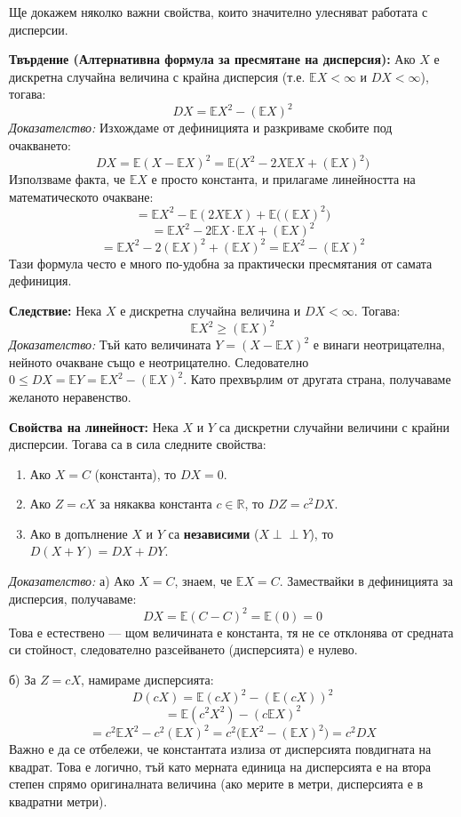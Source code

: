\documentclass{article}
\begin{document}
Ще докажем няколко важни свойства, които значително улесняват работата с дисперсии.

\textbf{Твърдение (Алтернативна формула за пресмятане на дисперсия):}
Ако $X$ е дискретна случайна величина с крайна дисперсия (т.е. $\mathbb{E}X < \infty$ и $DX < \infty$), тогава:
\[ DX = \mathbb{E}X^2 - (\mathbb{E}X)^2 \]
\textit{Доказателство:} Изхождаме от дефиницията и разкриваме скобите под очакването:
\[ DX = \mathbb{E}(X - \mathbb{E}X)^2 = \mathbb{E}\big( X^2 - 2X\mathbb{E}X + (\mathbb{E}X)^2 \big) \]
Използваме факта, че $\mathbb{E}X$ е просто константа, и прилагаме линейността на математическото очакване:
\[ = \mathbb{E}X^2 - \mathbb{E}(2X\mathbb{E}X) + \mathbb{E}\big( (\mathbb{E}X)^2 \big) \]
\[ = \mathbb{E}X^2 - 2\mathbb{E}X \cdot \mathbb{E}X + (\mathbb{E}X)^2 \]
\[ = \mathbb{E}X^2 - 2(\mathbb{E}X)^2 + (\mathbb{E}X)^2 = \mathbb{E}X^2 - (\mathbb{E}X)^2 \]
Тази формула често е много по-удобна за практически пресмятания от самата дефиниция.

\textbf{Следствие:} Нека $X$ е дискретна случайна величина и $DX < \infty$. Тогава:
\[ \mathbb{E}X^2 \ge (\mathbb{E}X)^2 \]
\textit{Доказателство:} Тъй като величината $Y = (X - \mathbb{E}X)^2$ е винаги неотрицателна, нейното очакване също е неотрицателно. Следователно $0 \le DX = \mathbb{E}Y = \mathbb{E}X^2 - (\mathbb{E}X)^2$. Като прехвърлим от другата страна, получаваме желаното неравенство.

\textbf{Свойства на линейност:}
Нека $X$ и $Y$ са дискретни случайни величини с крайни дисперсии. Тогава са в сила следните свойства:
\begin{enumerate}
    \item[а)] Ако $X = C$ (константа), то $DX = 0$.
    \item[б)] Ако $Z = cX$ за някаква константа $c \in \mathbb{R}$, то $DZ = c^2 DX$.
    \item[в)] Ако в допълнение $X$ и $Y$ са \textbf{независими} ($X \perp\!\!\!\perp Y$), то $D(X + Y) = DX + DY$.
\end{enumerate}

\textit{Доказателство:}
а) Ако $X = C$, знаем, че $\mathbb{E}X = C$. Замествайки в дефиницията за дисперсия, получаваме:
\[ DX = \mathbb{E}(C - C)^2 = \mathbb{E}(0) = 0 \]
Това е естествено — щом величината е константа, тя не се отклонява от средната си стойност, следователно разсейването (дисперсията) е нулево.

б) За $Z = cX$, намираме дисперсията:
\[ D(cX) = \mathbb{E}(cX)^2 - (\mathbb{E}(cX))^2 \]
\[ = \mathbb{E}(c^2 X^2) - (c\mathbb{E}X)^2 \]
\[ = c^2 \mathbb{E}X^2 - c^2 (\mathbb{E}X)^2 = c^2 \Big( \mathbb{E}X^2 - (\mathbb{E}X)^2 \Big) = c^2 DX \]
Важно е да се отбележи, че константата излиза от дисперсията повдигната на квадрат. Това е логично, тъй като мерната единица на дисперсията е на втора степен спрямо оригиналната величина (ако мерите в метри, дисперсията е в квадратни метри).
\end{document}
